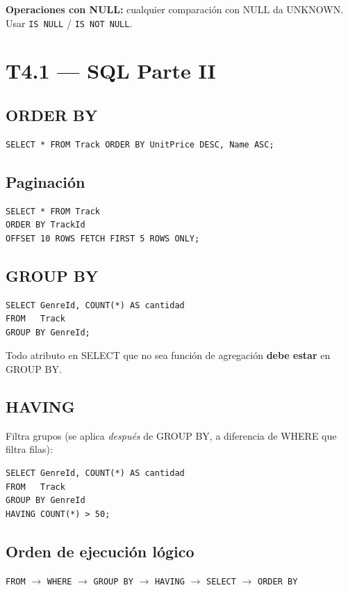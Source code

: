 \documentclass[12pt, a4paper]{article}
\begin{document}
\textbf{Operaciones con NULL:} cualquier comparación con NULL da UNKNOWN. Usar \texttt{IS NULL} / \texttt{IS NOT NULL}.

\section{T4.1 — SQL Parte II}

\subsection{ORDER BY}
\begin{lstlisting}
SELECT * FROM Track ORDER BY UnitPrice DESC, Name ASC;
\end{lstlisting}

\subsection{Paginación}
\begin{lstlisting}
SELECT * FROM Track
ORDER BY TrackId
OFFSET 10 ROWS FETCH FIRST 5 ROWS ONLY;
\end{lstlisting}

\subsection{GROUP BY}
\begin{lstlisting}
SELECT GenreId, COUNT(*) AS cantidad
FROM   Track
GROUP BY GenreId;
\end{lstlisting}
Todo atributo en SELECT que no sea función de agregación \textbf{debe estar} en GROUP BY.

\subsection{HAVING}
Filtra grupos (se aplica \textit{después} de GROUP BY, a diferencia de WHERE que filtra filas):
\begin{lstlisting}
SELECT GenreId, COUNT(*) AS cantidad
FROM   Track
GROUP BY GenreId
HAVING COUNT(*) > 50;
\end{lstlisting}

\subsection{Orden de ejecución lógico}
\texttt{FROM} $\rightarrow$ \texttt{WHERE} $\rightarrow$ \texttt{GROUP BY} $\rightarrow$ \texttt{HAVING} $\rightarrow$ \texttt{SELECT} $\rightarrow$ \texttt{ORDER BY}
\end{document}
